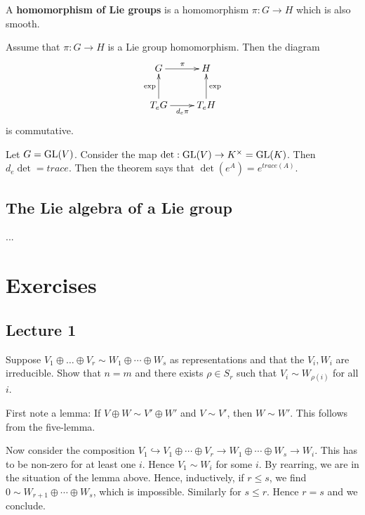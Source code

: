 \documentclass[11pt, english]{article}
\begin{document}
A \textbf{homomorphism of Lie groups} is a homomorphism $\pi:G \to H$ which is also smooth.

\begin{thm}
 Assume that $\pi:G \to H$ is a Lie group homomorphism. Then the diagram
$$
\xymatrix{
G \ar[r]^\pi & H \\
T_eG \ar[u]^{\exp} \ar[r]_{d_e\pi} & T_e H \ar[u]_\exp
}
$$
is commutative.
\end{thm}

\begin{example}
  Let $G = \operatorname{GL}(V)$. Consider the map $\det:\operatorname{GL}(V) \to K^\times = \operatorname{GL}(K)$. Then $d_e \det = trace$. Then the theorem says that $\det(e^A)=e^{trace(A)}$.
\end{example}

\subsection{The Lie algebra of a Lie group}
...


\appendix
\section{Exercises}

\subsection{Lecture 1}
\begin{exc}
Suppose $V_1 \oplus \ldots \oplus V_r \sim W_1 \oplus \cdots \oplus W_s$ as representations and that the $V_i,W_i$ are irreducible. Show that $n=m$ and there exists $\rho \in S_r$ such that $V_i \sim W_{\rho(i)}$ for all $i$.
\end{exc}
\begin{sol}
First note a lemma: If $V \oplus W \sim V' \oplus W'$ and $V \sim V'$, then $W \sim W'$. This follows from the five-lemma.

Now consider the composition $V_1 \hookrightarrow V_1 \oplus \cdots \oplus V_r  \to W_1 \oplus \cdots \oplus W_s \to W_i$. This has to be non-zero for at least one $i$. Hence $V_1 \sim W_i$ for some $i$. By rearring, we are in the situation of the lemma above. Hence, inductively, if $r \leq s$, we find $0 \sim W_{r+1} \oplus \cdots \oplus W_s$, which is impossible. Similarly for $s \leq r$. Hence $r=s$ and we conclude.
\end{sol}
\end{document}
